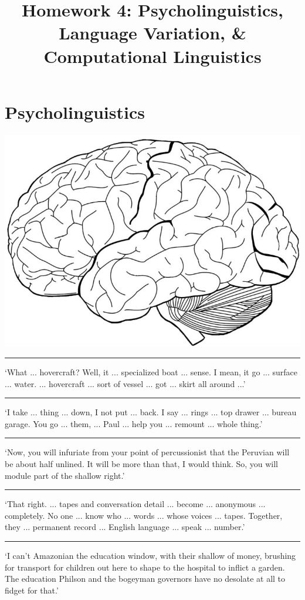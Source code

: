 \documentclass[addpoints]{exam}
\title{Homework 4: Psycholinguistics, Language Variation, \& Computational Linguistics}
\date{}
\begin{document}
  \maketitle

  

    \section{Psycholinguistics}
  \begin{questions}
        \question[4]
          \includegraphics{brain_unlabelled.jpg}

      \newpage

        \question[1] \rule{4cm}{0.4pt} `What ... hovercraft? Well, it ... specialized boat ... sense. I mean, it go ... surface ... water. ... hovercraft ... sort of vessel ... got ... skirt all around ...'
        \question[1] \rule{4cm}{0.4pt} `I take ... thing ... down, I not put ... back. I say ... rings ... top drawer ... bureau garage. You go ... them, ... Paul ... help you ... remount ... whole thing.'
        \question[1] \rule{4cm}{0.4pt} `Now, you will infuriate from your point of percussionist that the Peruvian will be about half unlined. It will be more than that, I would think. So, you will module part of the shallow right.'
        \question[1] \rule{4cm}{0.4pt} `That right. ... tapes and conversation detail ... become ... anonymous ... completely. No one ... know who ... words ... whose voices ... tapes. Together, they ... permanent record ... English language ... speak ... number.'
        \question[1] \rule{4cm}{0.4pt} `I can't Amazonian the education window, with their shallow of money, brushing for transport for children out here to shape to the hospital to inflict a garden. The education Philson and the bogeyman governors have no desolate at all to fidget for that.'


\end{questions}
\end{document}
